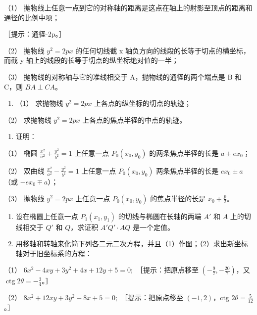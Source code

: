 （1）
抛物线上任意一点到它的对称轴的距离是这点在轴上的射影至顶点的距离和通径的比例中项；

［提示：通径-2p。］

（2） 抛物线 \(y^{2}=2px\) 的任何切线截 x
轴负方向的线段的长等于切点的横坐标，而截 y
轴上的线段的长等于切点的纵坐标绝对值的一半；

（3） 抛物线的对称轴与它的准线相交于 A，抛物线的通径的两个端点是 B 和
C，则 \(BA \perp CA\)。

\begin{enumerate}
\def\labelenumi{\arabic{enumi}.}
\setcounter{enumi}{33}
\tightlist
\item
  （1） 求抛物线 \(y^{2} = 2px\) 上各点的纵坐标的切点的轨迹；
\end{enumerate}

（2） 求抛物线 \(y^{2}=2px\) 上各点的焦点半径的中点的轨迹。

\begin{enumerate}
\def\labelenumi{\arabic{enumi}.}
\setcounter{enumi}{34}
\tightlist
\item
  证明：
\end{enumerate}

（1） 椭圆 \(\frac{x^{2}}{a^{2}} + \frac{y^{2}}{b^{2}} = 1\) 上任意一点
\(P_{0}(x_{0}, y_{0})\) 的两条焦点半径的长是 \(a \pm e x_{0}\)；

（2） 双曲线 \(\frac{x^{2}}{a^{2}} - \frac{y^{2}}{b^{2}} = 1\)
上任意一点 \(P_{0}(x_{0}, y_{0})\) 两条焦点半径的长是 \(ex_{0} \pm a\)
（或 \(-ex_{0} \mp a\)）；

（3） 抛物线 \(y^{2} = 2px\) 上任意一点 \(P_{0}(x_{0}, y_{0})\)
的焦点半径的长是 \(x_{0} + \frac{p}{2}\)。

\begin{enumerate}
\def\labelenumi{\arabic{enumi}.}
\setcounter{enumi}{35}
\item
  设在椭圆上任意一点 \(P_{1}(x_{1}, y_{1})\) 的切线与椭圆在长轴的两端
  \(A'\) 和 \(A\) 上的切线相交于 \(Q'\) 和 \(Q\)，求证积
  \(A'Q' \cdot AQ\) 是一个定值。
\item
  用移轴和转轴来化简下列各二元二次方程，并且（1）作图；（2）求出新坐标轴对于旧坐标系的方程：
\end{enumerate}

（1） \(6x^{2} - 4xy + 3y^{2} + 4x + 12y + 5 = 0;\) ［提示：把原点移至
\(\left(-\frac{9}{7},-\frac{20}{7}\right)\)，又
\(\operatorname{ctg}2\theta=-\frac{3}{4}\)。］

（2） \(8x^{2} + 12xy + 3y^{2} - 8x + 5 = 0;\) ［提示：把原点移至
\((-1,2)\)，ctg \(2\theta=\frac{5}{12}\)。］

